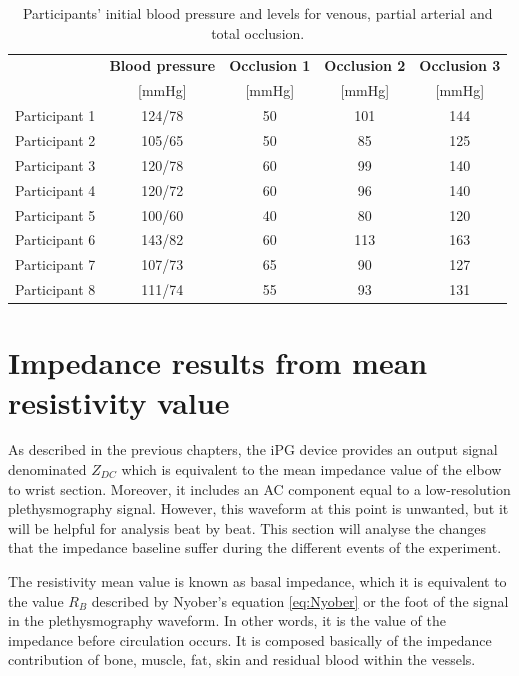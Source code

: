 \begin{table}[htbp] %
	\caption{Participants' initial blood pressure and levels for venous, partial arterial and total occlusion.}
	\label{tbl:occlusions}
	\centering
	\begin{tabular}    {lcccc}
		\toprule
		& \textbf{Blood pressure}  &  \textbf{Occlusion 1}   & \textbf{Occlusion 2}  &  \textbf{Occlusion 3} \\
		&  [\si{\mmHg}]   &        [\si{\mmHg}]  &    [\si{\mmHg}]   &  [\si{\mmHg}]\\ \midrule
		Participant 1  &  124/78   &        50  &    101   &  144\\ 
		Participant 2  &  105/65   &        50  &     85   &  125 \\
		Participant 3  &  120/78   &        60  &     99   &  140 \\
		Participant 4  &  120/72   &        60  &     96   &  140 \\
		Participant 5  &  100/60   &        40  &     80   &  120 \\
		Participant 6  &  143/82   &        60  &    113   &  163 \\
		Participant 7  &  107/73   &        65  &     90   &  127 \\
		Participant 8  &  111/74   &        55  &     93   &  131 \\\bottomrule
	\end{tabular}
\end{table}


\section{Impedance results from mean resistivity value}
\label{section5.2}
As described in the previous chapters, the iPG device provides an output signal denominated $Z_{DC}$ which is equivalent to the mean impedance value of the elbow to wrist section. Moreover, it includes an AC component equal to a low-resolution plethysmography signal. However, this waveform at this point is unwanted, but it will be helpful for analysis beat by beat. This section will analyse the changes that the impedance baseline suffer during the different events of the experiment.

The resistivity mean value is known as basal impedance, which it is equivalent to the value $R_B$ described by Nyober's equation \ref{eq:Nyober} or the foot of the signal in the plethysmography waveform. In other words, it is the value of the impedance before circulation occurs. It is composed basically of the impedance contribution of bone, muscle, fat, skin and residual blood within the vessels.

